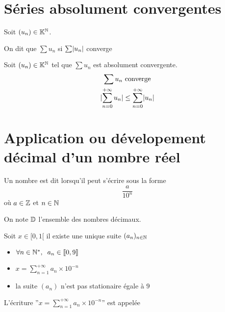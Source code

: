 \section{Séries absolument convergentes}

\begin{dfn}
Soit $(u_n) \in \mathbb{K}^{\mathbb{N}}$.

On dit que $\sum u_n$  si $\sum \abs*{u_n}$ converge
\end{dfn}

\begin{prp}
Soit $(u_n) \in \mathbb{K}^{\mathbb{N}}$ tel que $\sum u_n$ est absolument convergente.
\begin{gather*}
    \sum u_n \text{ converge} \\
    \abs{\sum^{+\infty}_{n = 0} u_n} \leq \sum^{+\infty}_{n = 0}
        \abs*{u_n }
\end{gather*}
\end{prp}

\section{Application ou dévelopement décimal d'un nombre réel}

\begin{dfn}
Un nombre est dit  lorsqu'il peut s'écrire sous la forme
\[
    \frac{a}{10^n}
\]
où $a \in \mathbb{Z}$ et $n \in \mathbb{N}$

On note $\mathbb{D}$ l'ensemble des nombres décimaux.
\end{dfn}

\begin{thm}
Soit $x \in [0, 1[$ il existe une unique suite $(a_n)_{n \in \mathbb{N}}$
\begin{itemize}
    \item $\forall n \in \mathbb{N}^*, \;\; a_n \in \llbracket 0, 9 \rrbracket$
    \item $x = \sum^{+\infty}_{n = 1} a_n \times 10^{-n}$
    \item la suite $(a_n)$ n'est pas stationaire égale à $9$
\end{itemize}
L'écriture ''$x = \sum^{+\infty}_{n = 1} a_n \times 10^{-n}$'' est appelée
\end{thm}



